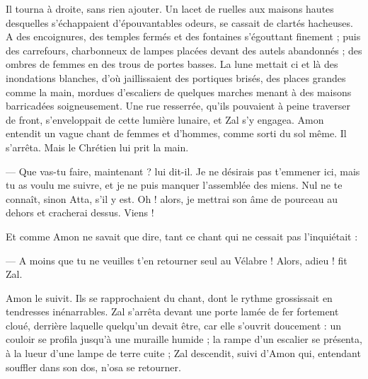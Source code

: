 \documentclass[a4paper, 11pt, oneside, polutonikogreek, french]{article}
\begin{document}
Il tourna à droite, sans rien ajouter. Un lacet de ruelles aux maisons hautes desquelles s'échappaient d'épouvantables odeurs, se cassait de clartés hacheuses. A des encoignures, des temples fermés et des fontaines s'égouttant finement ; puis des carrefours, charbonneux de lampes placées devant des autels abandonnés ; des ombres de femmes en des trous de portes basses. La lune mettait ci et là des inondations blanches, d'où jaillissaient des portiques brisés, des places grandes comme la main, mordues d'escaliers de quelques marches menant à des maisons barricadées soigneusement. Une rue resserrée, qu'ils pouvaient à peine traverser de front, s'enveloppait de cette lumière lunaire, et Zal s'y engagea. Amon entendit un vague chant de femmes et d'hommes, comme sorti du sol même. Il s'arrêta. Mais le Chrétien lui prit la main.

--- Que vas-tu faire, maintenant ? lui dit-il. Je ne désirais pas t'emmener ici, mais tu as voulu me suivre, et je ne puis manquer l'assemblée des miens. Nul ne te connaît, sinon Atta, s'il y est. Oh ! alors, je mettrai son âme de pourceau au dehors et cracherai dessus. Viens !

Et comme Amon ne savait que dire, tant ce chant qui ne cessait pas l'inquiétait :

--- A moins que tu ne veuilles t'en retourner seul au Vélabre ! Alors, adieu ! fit Zal.

Amon le suivit. Ils se rapprochaient du chant, dont le rythme grossissait en tendresses inénarrables. Zal s'arrêta devant une porte lamée de fer fortement cloué, derrière laquelle quelqu'un devait être, car elle s'ouvrit doucement : un couloir se profila jusqu'à une muraille humide ; la rampe d'un escalier se présenta, à la lueur d'une lampe de terre cuite ; Zal descendit, suivi d'Amon qui, entendant souffler dans son dos, n'osa se retourner.
\clearpage
\subsection{}
\end{document}
